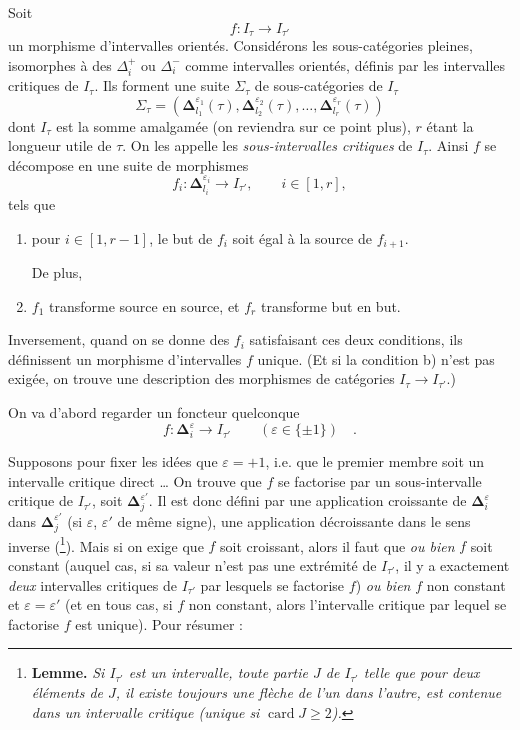 \documentclass[11pt]{article}
\newcommand{\printedpage}[1]{\if\relax\detokenize{#1}\relax\else\marginpar{\raggedright\footnotesize p.~#1}\fi}
\newcommand{\msp}[1]{\marginpar{\raggedright\footnotesize [#1]}}
\newcommand{\bDelta}{\boldsymbol{\Delta}}
\begin{document}
\msp{page 32}
Soit
\[
f : I_\tau\longrightarrow I_{\tau'}
\]
un morphisme d'intervalles orientés. Considérons les sous-catégories pleines, isomorphes à des $\Delta_i^+$ ou $\Delta_i^-$ comme intervalles orientés, définis par les intervalles critiques de $I_\tau$. Ils forment une suite $\Sigma_\tau$ de sous-catégories de $I_\tau$
\[
\Sigma_\tau=(\bDelta^{\varepsilon_1}_{l_1}(\tau),\bDelta^{\varepsilon_2}_{l_2}(\tau),\ldots,\bDelta^{\varepsilon_r}_{l_r}(\tau))
\]
dont $I_\tau$ est la somme amalgamée (on reviendra sur ce point plus), $r$ étant la longueur utile de $\tau$. On les appelle les \textit{sous-intervalles critiques} de $I_\tau$. Ainsi $f$ se décompose en une suite de morphismes
\[
f_i : \bDelta^{\varepsilon_i}_{l_i}\longrightarrow I_{\tau'},\qquad i\in[1,r],
\]
tels que
\begin{enumerate}
\item[a)] pour $i\in[1,r-1]$, le but de $f_i$ soit égal à la source de $f_{i+1}$.

De plus,
\item[b)] $f_1$ transforme source en source, et $f_r$ transforme but en but.
\end{enumerate}

Inversement, quand on se donne des $f_i$ satisfaisant ces deux conditions, ils définissent un morphisme d'intervalles $f$ unique. (Et si la condition b) n'est pas exigée, on trouve une description des morphismes de catégories $I_\tau\longrightarrow I_{\tau'}$.)

\msp{page 33}
On va d'abord regarder un foncteur quelconque
\[
f : \bDelta^{\varepsilon}_i\longrightarrow I_{\tau'}\qquad(\varepsilon\in\{\pm1\})\quad .
\]

\printedpage{22}
Supposons pour fixer les idées que $\varepsilon=+1$, i.e. que le premier membre soit un intervalle critique direct \ldots{} On trouve que $f$ se factorise par un sous-intervalle critique de $I_{\tau'}$, soit $\bDelta^{\varepsilon'}_j$. Il est donc défini par une application croissante de $\bDelta^{\varepsilon}_i$ dans $\bDelta^{\varepsilon'}_j$ (si $\varepsilon$, $\varepsilon'$ de même signe), une application décroissante dans le sens inverse (\footnote[11]{\textbf{Lemme.} \textit{Si $I_{\tau'}$ est un intervalle, toute partie $J$ de $I_{\tau'}$ telle que pour deux éléments de $J$, il existe toujours une flèche de l'un dans l'autre, est contenue dans un intervalle critique (unique si} $\operatorname{card} J\geq 2$\textit{).}}). Mais si on exige que $f$ soit croissant, alors il faut que \textit{ou bien} $f$ soit constant (auquel cas, si sa valeur n'est pas une extrémité de $I_{\tau'}$, il y a exactement \textit{deux} intervalles critiques de $I_{\tau'}$ par lesquels se factorise $f$) \textit{ou bien} $f$ non constant et $\varepsilon=\varepsilon'$ (et en tous cas, si $f$ non constant, alors l'intervalle critique par lequel se factorise $f$ est unique). Pour résumer :
\end{document}
